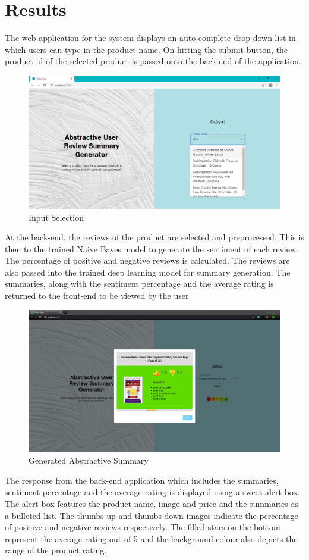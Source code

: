 \documentclass[11pt]{report}
\begin{document}
\chapter{Results}
The web application for the system displays an auto-complete drop-down list in which users can type in the product name. On hitting the submit button, the product id of the selected product is passed onto the back-end of the application. 
\begin{figure}[H]
\centering
\includegraphics[scale=0.5]{images/dropdown.png}
\caption{Input Selection}
\label{fig:input}
\end{figure}

At the back-end, the reviews of the product are selected and preprocessed. This is then to the trained Naive Bayes model to generate the sentiment of each review. The percentage of positive and negative reviews is calculated. The reviews are also passed into the trained deep learning model for summary generation. The summaries, along with the sentiment percentage and the average rating is returned to the front-end to be viewed by the user.
\begin{figure}[hbt!]
\centering
\includegraphics[scale=0.27]{images/FinalOutput.png}
\caption{Generated Abstractive Summary}
\label{fig:output}
\end{figure}
\newpage
The response from the back-end application which includes the summaries, sentiment percentage and the average rating is displayed using a sweet alert box. The alert box features the product name, image and price and the summaries as a bulleted list. The thumbs-up and thumbs-down images indicate the percentage of positive and negative reviews respectively. The filled stars on the bottom represent the average rating out of 5 and the background colour also depicts the range of the product rating. 
\end{document}
